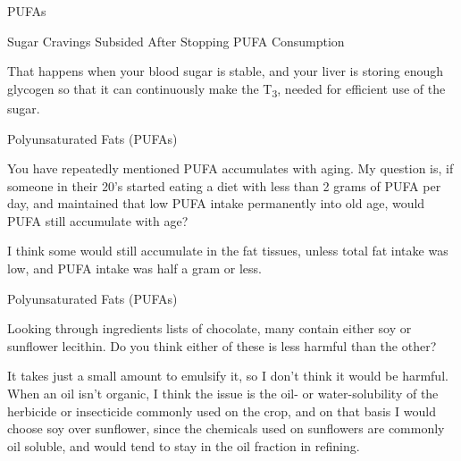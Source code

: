 \documentclass[11pt,oneside,openany,extrafontsizes]{memoir}
\begin{document}
\begin{standalonequote}{PUFAs}

    \begin{note}
        Sugar Cravings Subsided After Stopping PUFA Consumption
    \end{note}

    \begin{answer}
        That happens when your blood sugar is stable, and your liver is storing enough glycogen so that it can continuously make the T\textsubscript{3}, needed for efficient use of the sugar.
    \end{answer}
\end{standalonequote}

\begin{qaexchange}{Polyunsaturated Fats (PUFAs)}

    \begin{question}
        You have repeatedly mentioned PUFA accumulates with aging. My question is, if someone in their 20's started eating a diet with less than 2 grams of PUFA per day, and maintained that low PUFA intake permanently into old age, would PUFA still accumulate with age?
    \end{question}

    \begin{answer}
      I think some would still accumulate in the fat tissues, unless total fat intake was low, and PUFA intake was half a gram or less.
    \end{answer}
\end{qaexchange}

\begin{qaexchange}{Polyunsaturated Fats (PUFAs)}

    \begin{question}
        Looking through ingredients lists of chocolate, many contain either soy or sunflower lecithin. Do you think either of these is less harmful than the other?
    \end{question}

    \begin{answer}
       It takes just a small amount to emulsify it, so I don't think it would be harmful. When an oil isn't organic, I think the issue is the oil- or water-solubility of the herbicide or insecticide commonly used on the crop, and on that basis I would choose soy over sunflower, since the chemicals used on sunflowers are commonly oil soluble, and would tend to stay in the oil fraction in refining.
    \end{answer}
\end{qaexchange}
\end{document}

